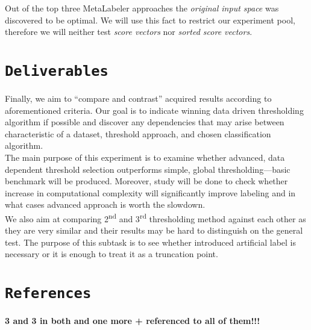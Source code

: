 \documentclass[12pt,a4paper,twocolumn]{article}
\newcommand{\ts}{\textsuperscript}
\begin{document}
Out of the top three MetaLabeler approaches the \emph{original input space} was discovered to be optimal. We will use this fact to restrict our experiment pool, therefore we will neither test \emph{score vectors} nor \emph{sorted score vectors}.\\

\section*{\texttt{Deliverables}}
Finally, we aim to ``compare and contrast'' acquired results according to aforementioned criteria. Our goal is to indicate winning data driven thresholding algorithm if possible and discover any dependencies that may arise between characteristic of a dataset, threshold approach, and chosen classification algorithm.\\

The main purpose of this experiment is to examine whether advanced, data dependent threshold selection outperforms simple, global thresholding---basic benchmark will be produced. Moreover, study will be done to check whether increase in computational complexity will significantly improve labeling and in what cases advanced approach is worth the slowdown.\\

We also aim at comparing 2\ts{nd} and 3\ts{rd} thresholding method against each other as they are very similar and their results may be hard to distinguish on the general test. The purpose of this subtask is to see whether introduced artificial label is necessary or it is enough to treat it as a truncation point.\\


\section*{\texttt{References}}
\textbf{ 3 and 3 in both and one more + referenced to all of them!!!}

\end{document}
